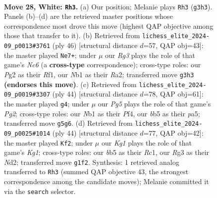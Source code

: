 \documentclass[11pt]{article}
\begin{document}
\clearpage

\begin{figure}[p]\centering
\begin{subfigure}{0.46\textwidth}\centering
\resizebox{\linewidth}{!}{%
\newchessgame
\chessboard[
  setfen={5rk1/4rppp/1n2p3/pbNn2P1/8/1P2P1R1/P5PP/RN1B2K1 w - - 5 28},
  showmover=false,
  pgfstyle=straightmove, color=movearrow, markmove={g3-h3}
]}
\caption{}
\end{subfigure}\hfill
\begin{subfigure}{0.46\textwidth}\centering
\resizebox{\linewidth}{!}{%
\newchessgame
\chessboard[
  setfen={2r2rk1/2p2ppp/ppNn4/3p4/NPnP2P1/4P3/R4P1P/5RK1 w - - 1 24},
  showmover=false,
  pgfstyle=straightmove, color=movearrow, markmove={c6-e7}
]}
\caption{}
\end{subfigure}
\\[4pt]
\begin{subfigure}{0.46\textwidth}\centering
\resizebox{\linewidth}{!}{%
\newchessgame
\chessboard[
  setfen={r3r1k1/1p3ppp/2p5/p2p1n2/P2P1P2/2NRP3/1P3KP1/1R6 w - - 1 23},
  showmover=false,
  pgfstyle=straightmove, color=movearrow, markmove={g2-g4}
]}
\caption{}
\end{subfigure}\hfill
\begin{subfigure}{0.46\textwidth}\centering
\resizebox{\linewidth}{!}{%
\newchessgame
\chessboard[
  setfen={rr6/3nkppp/p2nb3/4p3/N3P3/RP3P2/3NB1PP/2R3K1 w - - 1 23},
  showmover=false,
  pgfstyle=straightmove, color=movearrow, markmove={g1-f2}
]}
\caption{}
\end{subfigure}
\caption{\textbf{Move 28, White: \texttt{Rh3}.} (a) Our position; Melanie plays \texttt{Rh3} (\texttt{g3h3}). Panels (b)--(d) are the retrieved master positions whose correspondence most drove this move (highest QAP objective among those that transfer to it). (b) Retrieved from \texttt{lichess\_elite\_2024-09\_p0013\#3761} (ply 46) [structural distance $d$=57, QAP obj=43]: the master played \texttt{Ne7+}; under $\mu$ our \emph{Rg3} plays the role of that game's \emph{Nc6} (a \textbf{cross-type} correspondence); cross-type roles: our \emph{P}g2 as their \emph{R}f1, our \emph{N}b1 as their \emph{R}a2; transferred move \texttt{g3h3} \textbf{(endorses this move)}. (c) Retrieved from \texttt{lichess\_elite\_2024-09\_p0019\#3307} (ply 44) [structural distance $d$=78, QAP obj=61]: the master played \texttt{g4}; under $\mu$ our \emph{Pg5} plays the role of that game's \emph{Pg2}; cross-type roles: our \emph{N}b1 as their \emph{P}f4, our \emph{b}b5 as their \emph{p}a5; transferred move \texttt{g5g6}. (d) Retrieved from \texttt{lichess\_elite\_2024-09\_p0025\#1014} (ply 44) [structural distance $d$=77, QAP obj=42]: the master played \texttt{Kf2}; under $\mu$ our \emph{Kg1} plays the role of that game's \emph{Kg1}; cross-type roles: our \emph{b}b5 as their \emph{R}c1, our \emph{R}g3 as their \emph{N}d2; transferred move \texttt{g1f2}. Synthesis: 1 retrieved analog transferred to \texttt{Rh3} (summed QAP objective 43, the strongest correspondence among the candidate moves); Melanie committed it via the \texttt{search} selector.}
\label{fig:thought-m54}
\end{figure}
\end{document}
